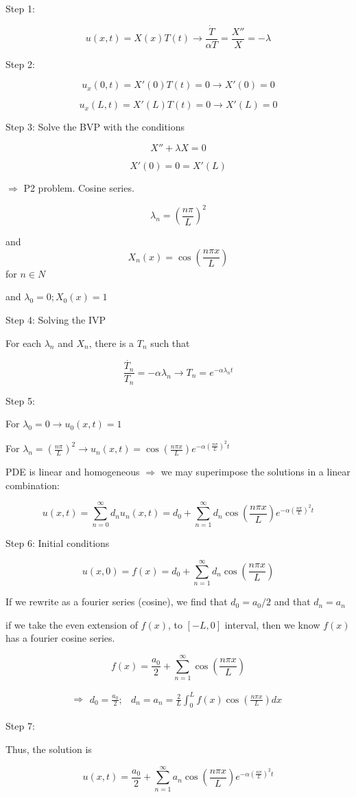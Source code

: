 Step 1:

$$u(x,t) = X(x) T(t) \rightarrow \frac{\dot T}{\alpha T} = \frac{X''}{X} = -\lambda$$

Step 2:

$$u_x (0,t) = X'(0) T(t) = 0 \rightarrow X'(0) = 0$$

$$u_x (L,t) = X'(L) T(t) = 0 \rightarrow X'(L) = 0$$

Step 3: Solve the BVP with the conditions

$$X'' + \lambda X = 0$$

$$X'(0) = 0 = X'(L)$$

$\Rightarrow$ P2 problem. Cosine series. 

$$\lambda_n = \left(\frac{n \pi}{L} \right)^2$$

and $$X_n(x) = \cos(\frac{n \pi x}{L})$$ for $n \in N$

and $\lambda_0 = 0; X_0 (x) = 1$

\hfill

\hfill

Step 4: Solving the IVP

For each $\lambda_n$ and $X_n$, there is a $T_n$ such that

$$\frac{\dot{T_n}}{T_n} = -\alpha \lambda_n \rightarrow T_n = e^{- \alpha \lambda_n t}$$

Step 5: 

For $\lambda_0 = 0 \rightarrow u_0 (x,t) = 1$

For $\lambda_n = \left(\frac{n \pi}{L} \right)^2 \rightarrow u_n (x,t) = \cos \left(\frac{n \pi x}{L} \right) e^{- \alpha \left(\frac{n \pi}{L} \right)^2 t}$

PDE is linear and homogeneous $\Rightarrow$ we may superimpose the solutions in a linear combination:

$$u(x,t) = \sum_{n = 0}^\infty d_n u_n (x,t) = d_0 + \sum_{n  =1}^\infty d_n \cos \left(\frac{n \pi x}{L} \right) e^{- \alpha \left(\frac{n \pi}{L} \right)^2 t}$$

Step 6: Initial conditions

$$u(x,0) = f(x) = d_0 + \sum_{n =1}^\infty d_n \cos \left(\frac{n \pi x}{L} \right)$$

If we rewrite as a fourier series (cosine), we find that $d_0 = a_0 / 2$ and that $d_n = a_n$

if we take the even extension of $f(x)$, to $[-L, 0]$ interval, then we know $f(x)$ has a fourier cosine series. 

$$f(x) = \frac{a_0}{2} + \sum_{n = 1}^\infty \cos \left(\frac{n \pi x}{L} \right)$$

$$\Rightarrow \begin{matrix} d_0 = \frac{a_0}{2}; & d_n = a_n = \frac{2}{L} \int_0^L f(x) \cos \left(\frac{n \pi x}{L} \right) dx \end{matrix}$$

Step 7:

Thus, the solution is 

$$u(x,t) = \frac{a_0}{2} + \sum_{n = 1}^\infty a_n \cos \left(\frac{n \pi x}{L} \right) e^{- \alpha \left(\frac{n \pi}{L} \right)^2 t}$$